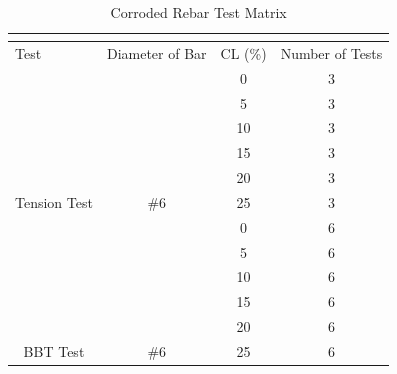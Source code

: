 \begin{table}[]
	\caption{Corroded Rebar Test Matrix}
	\label{tab:Test Matrix}
	\centering	
	\begin{tabular}{|c|c|c|c|}
	\hline
	\multicolumn{4}{|c|}{\cellcolor[HTML]{CC0000}{\color[HTML]{FFFFFF} Corroded BBT Test Matrix}}                                               \\ \hline
	\multicolumn{1}{|l|}{Test}     & \multicolumn{1}{l|}{Diameter of Bar} & \multicolumn{1}{l|}{CL (\%)} & \multicolumn{1}{l|}{Number of Tests} \\ \hline
	                               &                                      & 0                            & 3                                    \\ \cline{3-4} 
	                               &                                      & 5                            & 3                                    \\ \cline{3-4} 
	                               &                                      & 10                           & 3                                    \\ \cline{3-4} 
	                               &                                      & 15                           & 3                                    \\ \cline{3-4} 
	                               &                                      & 20                           & 3                                    \\ \cline{3-4} 
	\multirow{-6}{*}{Tension Test} & \multirow{-6}{*}{\#6}                & 25                           & 3                                    \\ \hline
	                               &                                      & 0                            & 6                                    \\ \cline{3-4} 
	                               &                                      & 5                            & 6                                    \\ \cline{3-4} 
	                               &                                      & 10                           & 6                                    \\ \cline{3-4} 
	                               &                                      & 15                           & 6                                    \\ \cline{3-4} 
	                               &                                      & 20                           & 6                                    \\ \cline{3-4} 
	\multirow{-6}{*}{BBT Test}     & \multirow{-6}{*}{\#6}                & 25                           & 6                                    \\ \hline
	\end{tabular}
\end{table}


